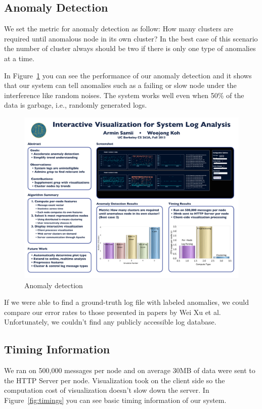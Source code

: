 \documentclass[conference]{style/acmsiggraph}
\begin{document}
\subsection{Anomaly Detection}
We set the metric for anomaly detection as follow: How many clusters are required until anomalous
node in its own cluster? In the best case of this scenario the number of cluster always should be
two if there is only one type of anomalies at a time.

In Figure~\ref{fig:anomaly} you can see the performance of our anomaly detection and it shows that
our system can tell anomalies such as a failing or slow node under the interference like random
noises. The system works well even when 50\% of the data is garbage, i.e., randomly generated logs.

\begin{figure}[p]
    \centering
    \includegraphics[width=1.0\columnwidth]{images/anomaly.pdf}
    \caption{Anomaly detection}
    \label{fig:anomaly}
\end{figure}

If we were able to find a ground-truth log file with labeled anomalies, we could compare our error
rates to those presented in papers by Wei Xu et al. Unfortunately, we couldn't find any publicly
accessible log database.

\subsection{Timing Information}
We ran on 500,000 messages per node and on average 30MB of data were sent to the HTTP Server per
node. Visualization took on the client side so the computation cost of visualization doesn't slow
down the server. In Figure~\ref{fig:timings} you can see basic timing information of our system.
\end{document}
